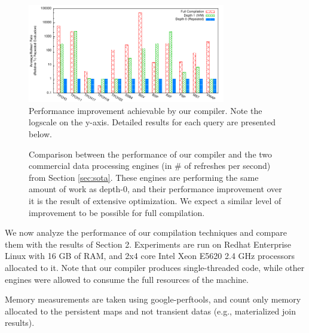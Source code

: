 
\newcommand{\figurewidth}[0]{1.8in}

\newcommand{\tablefig}[1]{
  \hspace*{-0.25in}
  \texttt{[image: ../graphs/graphs/\#1]}
}

\begin{figure}
\begin{center}
\includegraphics[width=3.4in]{../graphs/graphs/bakeoff.pdf}
\caption{Performance improvement achievable by our compiler.  Note the logscale on the y-axis.  Detailed results for each query are presented below.}
\label{fig:experiments:bakeoff}
\end{center}
\vspace*{-0.2in}
\end{figure}

\begin{figure}
\begin{center}
\resizebox{3.3in}{!}{

}
\caption{Comparison between the performance of our compiler and the two commercial data processing engines (in \# of refreshes per second) from Section \ref{sec:sota}.  These engines are performing the same amount of work as depth-0, and their performance improvement over it is the result of extensive optimization.  We expect a similar level of improvement to be possible for full compilation.}
\label{fig:experiments:enginesVsDBT}
\vspace*{-0.3in}
\end{center}
\end{figure}

We now analyze the performance of our compilation techniques and compare them with the results of Section 2.  Experiments are run on Redhat Enterprise Linux with 16 GB of RAM, and 2x4 core Intel Xeon E5620 2.4 GHz processors allocated to it.  Note that our compiler produces single-threaded code, while other engines were allowed to consume the full resources of the machine.

Memory measurements are taken using google-perftools\cite{perftools}, and count only memory allocated to the persistent maps and not transient datas (e.g., materialized join results).  

